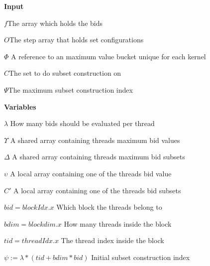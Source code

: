 \documentclass[a4paper, 12pt]{report}
\begin{document}
\thispagestyle{empty}

\thispagestyle{empty}
\pagestyle{empty}
\textbf{Input}

$f$\hfill The array which holds the bids

$O$\hfill The step array that holds set configurations

$ \Phi $ \hfill A reference to an maximum value bucket unique for each kernel

$C$\hfill The set to do subset construction on

$\Psi$\hfill The maximum subset construction index


\textbf{Variables} 

$\lambda$ \hfill How many bids should be evaluated per thread

$\Upsilon$ \hfill A shared array containing threads maximum bid values

$\Delta$ \hfill A shared array containing threads maximum bid subsets

$\upsilon$ \hfill A local array containing one of the threads bid value

$C'$ \hfill A local array containing one of the threads bid subsets

$bid = blockIdx.x$ \hfill Which block the threads belong to

$bdim = blockdim.x$ \hfill How many threads inside the block

$tid = threadIdx.x$ \hfill The thread index inside the block

$\psi := \lambda*(tid+bdim*bid)$ \hfill Initial subset construction index
\end{document}
